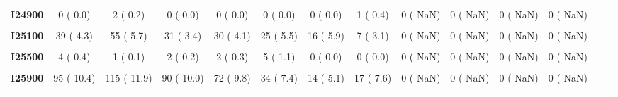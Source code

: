 \documentclass[
]{article}
\begin{document}
\begin{table}[H]
\begin{tabular}[t]{>{\raggedright\arraybackslash}p{5em}ccccccccccccc}
\textbf{I24900} & 0 (  0.0) & 2 (  0.2) & 0 (  0.0) & 0 (  0.0) & 0 (  0.0) & 0 (  0.0) & 1 (  0.4) & 0 (  NaN) & 0 (  NaN) & 0 (  NaN) & 0 (  NaN) &  & \\
\textbf{\cellcolor{gray!10}{I25000}} & \cellcolor{gray!10}{5 (  0.5)} & \cellcolor{gray!10}{5 (  0.5)} & \cellcolor{gray!10}{4 (  0.4)} & \cellcolor{gray!10}{2 (  0.3)} & \cellcolor{gray!10}{0 (  0.0)} & \cellcolor{gray!10}{0 (  0.0)} & \cellcolor{gray!10}{0 (  0.0)} & \cellcolor{gray!10}{0 (  NaN)} & \cellcolor{gray!10}{0 (  NaN)} & \cellcolor{gray!10}{0 (  NaN)} & \cellcolor{gray!10}{0 (  NaN)} & \cellcolor{gray!10}{} & \cellcolor{gray!10}{}\\
\textbf{I25100} & 39 (  4.3) & 55 (  5.7) & 31 (  3.4) & 30 (  4.1) & 25 (  5.5) & 16 (  5.9) & 7 (  3.1) & 0 (  NaN) & 0 (  NaN) & 0 (  NaN) & 0 (  NaN) &  & \\
\textbf{\cellcolor{gray!10}{I25200}} & \cellcolor{gray!10}{20 (  2.2)} & \cellcolor{gray!10}{11 (  1.1)} & \cellcolor{gray!10}{6 (  0.7)} & \cellcolor{gray!10}{0 (  0.0)} & \cellcolor{gray!10}{0 (  0.0)} & \cellcolor{gray!10}{0 (  0.0)} & \cellcolor{gray!10}{0 (  0.0)} & \cellcolor{gray!10}{0 (  NaN)} & \cellcolor{gray!10}{0 (  NaN)} & \cellcolor{gray!10}{0 (  NaN)} & \cellcolor{gray!10}{0 (  NaN)} & \cellcolor{gray!10}{} & \cellcolor{gray!10}{}\\
\textbf{I25500} & 4 (  0.4) & 1 (  0.1) & 2 (  0.2) & 2 (  0.3) & 5 (  1.1) & 0 (  0.0) & 0 (  0.0) & 0 (  NaN) & 0 (  NaN) & 0 (  NaN) & 0 (  NaN) &  & \\
\textbf{\cellcolor{gray!10}{I25800}} & \cellcolor{gray!10}{20 (  2.2)} & \cellcolor{gray!10}{37 (  3.8)} & \cellcolor{gray!10}{27 (  3.0)} & \cellcolor{gray!10}{20 (  2.7)} & \cellcolor{gray!10}{16 (  3.5)} & \cellcolor{gray!10}{10 (  3.7)} & \cellcolor{gray!10}{5 (  2.2)} & \cellcolor{gray!10}{0 (  NaN)} & \cellcolor{gray!10}{0 (  NaN)} & \cellcolor{gray!10}{0 (  NaN)} & \cellcolor{gray!10}{0 (  NaN)} & \cellcolor{gray!10}{} & \cellcolor{gray!10}{}\\
\textbf{I25900} & 95 ( 10.4) & 115 ( 11.9) & 90 ( 10.0) & 72 (  9.8) & 34 (  7.4) & 14 (  5.1) & 17 (  7.6) & 0 (  NaN) & 0 (  NaN) & 0 (  NaN) & 0 (  NaN) &  & \\
\textbf{\cellcolor{gray!10}{I26900}} & \cellcolor{gray!10}{0 (  0.0)} & \cellcolor{gray!10}{0 (  0.0)} & \cellcolor{gray!10}{1 (  0.1)} & \cellcolor{gray!10}{0 (  0.0)} & \cellcolor{gray!10}{1 (  0.2)} & \cellcolor{gray!10}{1 (  0.4)} & \cellcolor{gray!10}{0 (  0.0)} & \cellcolor{gray!10}{0 (  NaN)} & \cellcolor{gray!10}{0 (  NaN)} & \cellcolor{gray!10}{0 (  NaN)} & \cellcolor{gray!10}{0 (  NaN)} & \cellcolor{gray!10}{} & \cellcolor{gray!10}{}\\

\end{tabular}
\end{table}
\end{document}
